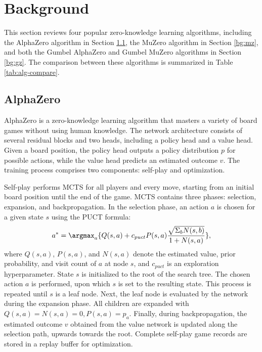 \section{Background}
This section reviews four popular zero-knowledge learning algorithms, including the AlphaZero algorithm in Section \ref{bg:az}, the MuZero algorithm in Section \ref{bg:mz}, and both the Gumbel AlphaZero and Gumbel MuZero algorithms in Section \ref{bg:gz}.
The comparison between these algorithms is summarized in Table \ref{tab:alg-compare}.


\subsection{AlphaZero}\label{bg:az}
AlphaZero \cite{silver_general_2018} is a zero-knowledge learning algorithm that masters a variety of board games without using human knowledge.
The network architecture consists of several residual blocks \cite{he_deep_2016} and two heads, including a policy head and a value head.
Given a board position, the policy head outputs a policy distribution $p$ for possible actions, while the value head predicts an estimated outcome $v$.
The training process comprises two components: self-play and optimization.

Self-play performs MCTS \cite{browne_survey_2012, coulom_efficient_2007, kocsis_bandit_2006} for all players and every move, starting from an initial board position until the end of the game.
MCTS contains three phases: selection, expansion, and backpropagation.
In the selection phase, an action $a$ is chosen for a given state $s$ using the PUCT \cite{rosin_multiarmed_2011, silver_mastering_2017} formula:
\begin{equation}\label{eq:az_puct}
a^{*} = \argmax_a \{ Q(s,a)+c_{puct} P(s,a)\frac{\sqrt{\Sigma_bN(s,b)}}{1+N(s,a)}\},
\end{equation}
where $Q(s,a)$, $P(s,a)$, and $N(s,a)$ denote the estimated value, prior probability, and visit count of $a$ at node $s$, and $c_{puct}$ is an exploration hyperparameter.
State $s$ is initialized to the root of the search tree. The chosen action $a$ is performed, upon which $s$ is set to the resulting state. This process is repeated until $s$ is a leaf node.
Next, the leaf node is evaluated by the network during the expansion phase. All children are expanded with $Q(s,a)=N(s,a)=0, P(s,a)=p_a$.
Finally, during backpropagation, the estimated outcome $v$ obtained from the value network is updated along the selection path, upwards towards the root.
Complete self-play game records are stored in a replay buffer for optimization.

